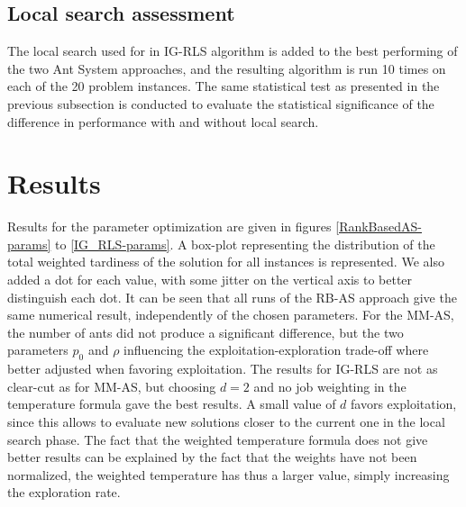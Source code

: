 \documentclass[runningheads]{llncs}
\begin{document}
\subsection{Local search assessment}

The local search used for in IG-RLS algorithm is added to the best performing of
the two Ant System approaches, and the resulting algorithm is run 10 times on
each of the 20 problem instances. The same statistical test as presented in the
previous subsection is conducted to evaluate the statistical significance of the
difference in performance with and without local search.


\section{Results}
\label{sec:res}

Results for the parameter optimization are given in figures
\ref{RankBasedAS-params} to \ref{IG_RLS-params}. A box-plot representing the
distribution of the total weighted tardiness of the solution for all instances
is represented. We also added a dot for each value, with some jitter on the
vertical axis to better distinguish each dot. It can be seen that all runs of
the RB-AS approach give the same numerical result, independently of the chosen
parameters. For the MM-AS, the number of ants did not produce a significant
difference, but the two parameters $p_0$ and $\rho$ influencing the
exploitation-exploration trade-off where better adjusted when favoring
exploitation. The results for IG-RLS are not as clear-cut as for MM-AS, but
choosing $d=2$ and no job weighting in the temperature formula gave the best
results. A small value of $d$ favors exploitation, since this allows to evaluate
new solutions closer to the current one in the local search phase. The fact that
the weighted temperature formula does not give better results can be explained
by the fact that the weights have not been normalized, the weighted temperature
has thus a larger value, simply increasing the exploration rate.

\begin{figure}
\end{figure}
\end{document}
